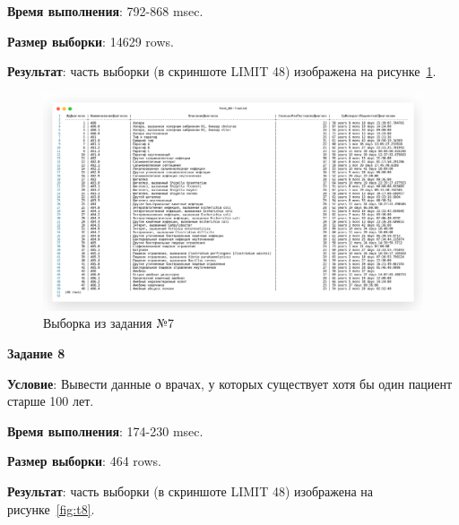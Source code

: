 \textbf{Время выполнения}: 792-868 msec.

\textbf{Размер выборки}: 14629 rows.

\textbf{Результат}: часть выборки (в скриншоте LIMIT 48) изображена на рисунке~\ref{fig:t7}.

\begin{figure}[!h]
  \centering

  \includegraphics[width=18cm]
  {../sql/task7/7-out.png}

  \caption{Выборка из задания №7}

  \label{fig:t7}
\end{figure}

\newpage


\begin{center}
  \textbf{Задание 8}
\end{center}
  
\textbf{Условие}:
Вывести данные о врачах, у которых существует хотя бы один пациент старше 100 лет.








\textbf{Время выполнения}: 174-230 msec.

\textbf{Размер выборки}: 464 rows.

\textbf{Результат}: часть выборки (в скриншоте LIMIT 48) изображена на рисунке~\ref{fig:t8}.


